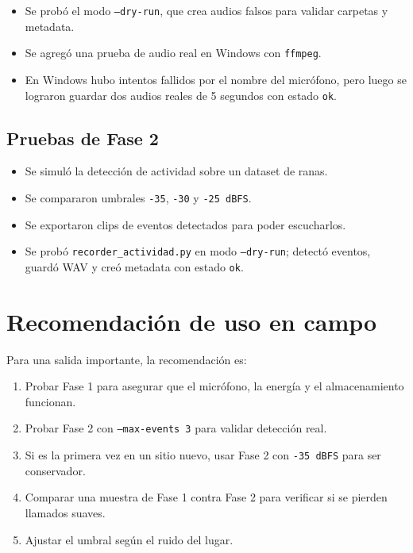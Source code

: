 \documentclass[11pt,letterpaper]{article}
\newcommand{\archivo}[1]{\texttt{#1}}
\begin{document}
\begin{itemize}[leftmargin=*]
  \item Se probó el modo \archivo{--dry-run}, que crea audios falsos para validar carpetas y metadata.
  \item Se agregó una prueba de audio real en Windows con \archivo{ffmpeg}.
  \item En Windows hubo intentos fallidos por el nombre del micrófono, pero luego se lograron guardar dos audios reales de 5 segundos con estado \archivo{ok}.
\end{itemize}

\subsection{Pruebas de Fase 2}

\begin{itemize}[leftmargin=*]
  \item Se simuló la detección de actividad sobre un dataset de ranas.
  \item Se compararon umbrales \archivo{-35}, \archivo{-30} y \archivo{-25 dBFS}.
  \item Se exportaron clips de eventos detectados para poder escucharlos.
  \item Se probó \archivo{recorder\_actividad.py} en modo \archivo{--dry-run}; detectó eventos, guardó WAV y creó metadata con estado \archivo{ok}.
\end{itemize}

\section{Recomendación de uso en campo}

Para una salida importante, la recomendación es:

\begin{enumerate}[leftmargin=*]
  \item Probar Fase 1 para asegurar que el micrófono, la energía y el almacenamiento funcionan.
  \item Probar Fase 2 con \archivo{--max-events 3} para validar detección real.
  \item Si es la primera vez en un sitio nuevo, usar Fase 2 con \archivo{-35 dBFS} para ser conservador.
  \item Comparar una muestra de Fase 1 contra Fase 2 para verificar si se pierden llamados suaves.
  \item Ajustar el umbral según el ruido del lugar.
\end{enumerate}
\end{document}
